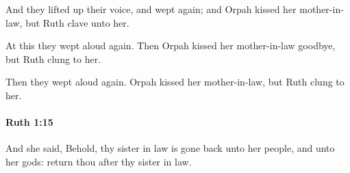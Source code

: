 			\begin{versebox}
					\item[BHS] 
					\item[LXX] 
					\item[ASV] And they lifted up their voice, and wept again; and Orpah kissed her mother-in-law, but Ruth clave unto her.
					\item[NIV] At this they wept aloud again. Then Orpah kissed her mother-in-law goodbye, but Ruth clung to her.
					\item[NRSV] Then they wept aloud again. Orpah kissed her mother-in-law, but Ruth clung to her.
			\end{versebox}

		\paragraph{Ruth 1:15} %
			\label{RUTH-1-15}

			And she said, Behold, thy sister in law is gone back unto her people, and unto her gods: return thou after thy sister in law.


